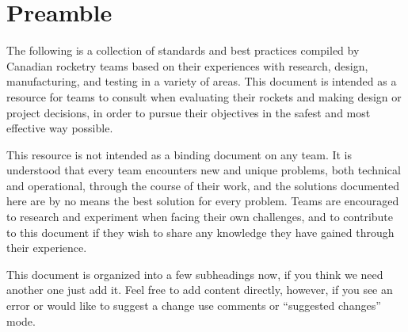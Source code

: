 \section{Preamble}
The following is a collection of standards and best practices compiled by Canadian rocketry teams based on their experiences with research, design, manufacturing, and testing in a variety of areas. This document is intended as a resource for teams to consult when evaluating their rockets and making design or project decisions, in order to pursue their objectives in the safest and most effective way possible.

This resource is not intended as a binding document on any team. It is understood that every team encounters new and unique problems, both technical and operational, through the course of their work, and the solutions documented here are by no means the best solution for every problem. Teams are encouraged to research and experiment when facing their own challenges, and to contribute to this document if they wish to share any knowledge they have gained through their experience.

This document is organized into a few subheadings now, if you think we need another one just add it. Feel free to add content directly, however, if you see an error or would like to suggest a change use comments or “suggested changes” mode.
